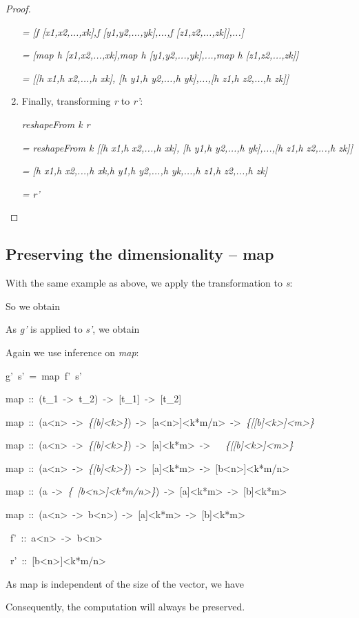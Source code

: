 \documentclass{article}
\newenvironment{lyxcode}
{\par\begin{list}{}{
\setlength{\rightmargin}{\leftmargin}
\setlength{\listparindent}{0pt}\raggedright
\setlength{\itemsep}{0pt}
\setlength{\parsep}{0pt}
\normalfont\ttfamily}\item[]}
{\end{list}}
\begin{document}
\begin{proof}
\begin{enumerate}
\emph{= {[}f {[}x1,x2,...,xk{]},f {[}y1,y2,...,yk{]},...,f {[}z1,z2,...,zk{]}{]},...{]}}


\emph{= {[}map h {[}x1,x2,...,xk{]},map h {[}y1,y2,...,yk{]},...,map
h {[}z1,z2,...,zk{]}{]}}


\emph{= {[}{[}h x1,h x2,...,h xk{]}, {[}h y1,h y2,...,h yk{]},...,{[}h
z1,h z2,...,h zk{]}{]}}

\item Finally, transforming \emph{r} to \emph{r'}:


\emph{reshapeFrom k r }


\emph{= reshapeFrom k {[}{[}h x1,h x2,...,h xk{]}, {[}h y1,h y2,...,h
yk{]},...,{[}h z1,h z2,...,h zk{]}{]} }


\emph{= {[}h x1,h x2,...,h xk,h y1,h y2,...,h yk,...,h z1,h z2,...,h
zk{]} }


\emph{= r'}

\end{enumerate}
\end{proof}


\subsection{Preserving the dimensionality -- map}

With the same example as above, we apply the transformation\emph{
} to \emph{s}:



\emph{}



So we obtain



As \emph{g'} is applied to \emph{s'}, we obtain 



Again we use inference on \emph{map}:
\begin{lyxcode}
g'~s'~=~map~f'~s'

map~::~(t\_1~->~t\_2)~->~{[}t\_1{]}~->~{[}t\_2{]}

map~::~(a<n>~->~\emph{\{{[}b{]}<k>\}})~->~{[}a<n>{]}<k{*}m/n>~->~\emph{\{{[}{[}b{]}<k>{]}<m>\}}

map~::~(a<n>~->~\emph{\{{[}b{]}<k>\}})~->~{[}a{]}<k{*}m>~->~\emph{~~\{{[}{[}b{]}<k>{]}<m>\}}

map~::~(a<n>~->~\emph{\{{[}b{]}<k>\}})~->~{[}a{]}<k{*}m>~->~{[}b<n>{]}<k{*}m/n>

map~::~(a~->~\emph{\{}~\emph{{[}b<n>{]}<k{*}m/n>\}})~->~{[}a{]}<k{*}m>~->~{[}b{]}<k{*}m>

map~::~(a<n>~->~b<n>)~->~{[}a{]}<k{*}m>~->~{[}b{]}<k{*}m>

~f'~::~a<n>~->~b<n>

~r'~::~{[}b<n>{]}<k{*}m/n>
\end{lyxcode}
As map is independent of the size of the vector, we have 
\begin{lyxcode}

\end{lyxcode}
Consequently, the computation will always be preserved.
\end{document}
